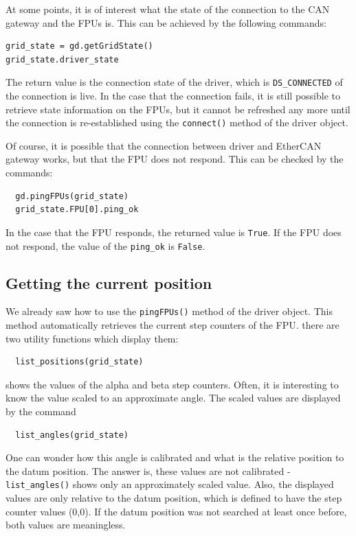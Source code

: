 \documentclass{scrartcl}[12pt,a4paper]
\begin{document}
At some points, it is of interest what the state of
the connection to the CAN gateway and the FPUs is.
This can be achieved by the following commands:
\begin{verbatim}
grid_state = gd.getGridState()
grid_state.driver_state  
\end{verbatim}

The return value is the connection state of the driver, which is
\texttt{DS\_CONNECTED} of the connection is live.  In the case that the
connection fails, it is still possible to retrieve state information
on the FPUs, but it cannot be refreshed any more until the connection
is re-established using the \texttt{connect()} method of the driver
object.

Of course, it is possible that the connection between driver
and EtherCAN gateway works, but that the FPU does not
respond. This can be checked by the commands:

\begin{verbatim}
  gd.pingFPUs(grid_state)
  grid_state.FPU[0].ping_ok
\end{verbatim}

In the case that the FPU responds, the returned value is
\texttt{True}.  If the FPU does not respond, the
value of the \verb+ping_ok+ is \texttt{False}.



\subsection{Getting the current position}

We already saw how to use the \texttt{pingFPUs()} method
of the driver object. This method automatically
retrieves the current step counters of the FPU.
there are two utility functions which display them:

\begin{verbatim}
  list_positions(grid_state)
\end{verbatim}

shows the values of the alpha and beta step counters.
Often, it is interesting to know the value scaled
to an approximate angle. The scaled values
are displayed by the command

\begin{verbatim}
  list_angles(grid_state)
\end{verbatim}


One can wonder how this angle is calibrated and
what is the relative position to the datum
position. The answer is, these values are
not calibrated - \texttt{list\_angles()}
shows only an approximately scaled value.
Also, the displayed values are only relative
to the datum position, which is defined to
have the step counter values (0,0). If
the datum position was not searched
at least once before, both values are meaningless.
\end{document}
